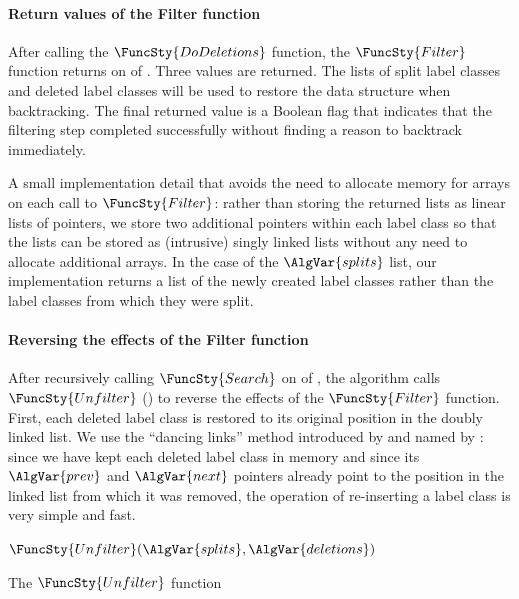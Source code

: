 \paragraph{Return values of the Filter function}
After calling the $\FuncSty{DoDeletions}$ function,
the $\FuncSty{Filter}$ function returns on  
of .  Three values are returned. The lists
of split label classes and deleted label classes will be used to restore
the data structure when backtracking. The final returned value is a Boolean
flag that indicates that the filtering step completed successfully
without finding a reason to backtrack immediately.

A small implementation detail that avoids the need to allocate
memory for arrays on each call to $\FuncSty{Filter}$: rather than storing the returned lists
as linear lists of pointers, we store two additional pointers within
each label class so that the lists can be stored as (intrusive) singly linked
lists without any need to allocate additional arrays.  In the case of the
$\AlgVar{splits}$ list, our implementation returns a list of the newly created
label classes rather than the label classes from which they were split.

\paragraph{Reversing the effects of the Filter function}
After recursively calling $\FuncSty{Search}$ on 
of , the algorithm calls $\FuncSty{Unfilter}$
() to reverse the effects of the $\FuncSty{Filter}$
function.  
First, each deleted label class is restored to its
original position in the doubly linked list.  We use the ``dancing links'' method
introduced by \citet{DBLP:journals/ipl/HitotumatuN79} and named by
\citet{knuth2020art}: since we have kept each deleted label class
in memory and since its $\AlgVar{prev}$ and $\AlgVar{next}$ pointers
already point to the position in the linked list from which it was removed,
the operation of re-inserting a label class is very simple and fast.

\begin{algorithm}[htb]
\AlgorithmFontSize
\DontPrintSemicolon
\nl $\FuncSty{Unfilter}(\AlgVar{splits}, \AlgVar{deletions})$ \;
\nl {}
\caption{The $\FuncSty{Unfilter}$ function}
\label{McSplitSIAlgUnfilter}
\end{algorithm}

